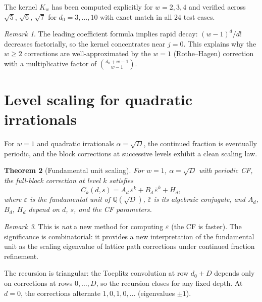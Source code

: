 \documentclass[11pt]{article}
\newtheorem{theorem}{Theorem}[section]
\theoremstyle{definition}
\theoremstyle{remark}
\newtheorem{remark}[theorem]{Remark}
\begin{document}
The kernel $K_w$ has been computed explicitly for $w = 2, 3, 4$
and verified across $\sqrt{5}$, $\sqrt{6}$, $\sqrt{7}$ for
$d_0 = 3, \ldots, 10$ with exact match in all $24$ test cases.

\begin{remark}
The leading coefficient formula implies rapid decay:
$(w-1)^d/d!$ decreases factorially, so the kernel concentrates
near $j = 0$.
This explains why the $w \geq 2$ corrections are well-approximated
by the $w = 1$ (Rothe--Hagen) correction with a multiplicative
factor of $\binom{d_0 + w - 1}{w - 1}$.
\end{remark}

\section{Level scaling for quadratic irrationals}%
\label{sec:scaling}

For $w = 1$ and quadratic irrationals $\alpha = \sqrt{D}$, the
continued fraction is eventually periodic, and the block corrections
at successive levels exhibit a clean scaling law.

\begin{theorem}[Fundamental unit scaling]\label{thm:scaling}
For $w = 1$, $\alpha = \sqrt{D}$ with periodic CF, the full-block
correction at level $k$ satisfies
\begin{equation}\label{eq:scaling}
  C_k(d, s) = A_d\, \varepsilon^k + B_d\, \bar{\varepsilon}^k + H_d,
\end{equation}
where $\varepsilon$ is the fundamental unit of
$\mathbb{Q}(\sqrt{D})$, $\bar{\varepsilon}$ is its algebraic
conjugate, and $A_d$, $B_d$, $H_d$ depend on $d$, $s$, and the
CF parameters.
\end{theorem}

\begin{remark}
This is \emph{not} a new method for computing $\varepsilon$ (the CF
is faster).
The significance is combinatorial: it provides a new interpretation
of the fundamental unit as the scaling eigenvalue of lattice path
corrections under continued fraction refinement.
\end{remark}

The recursion is triangular: the Toeplitz convolution at row
$d_0 + D$ depends only on corrections at rows $0, \ldots, D$, so
the recursion closes for any fixed depth.
At $d = 0$, the corrections alternate $1, 0, 1, 0, \ldots$
(eigenvalues $\pm 1$).
\end{document}
